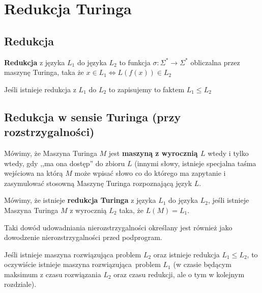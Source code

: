 \section{Redukcja Turinga}

\subsection{Redukcja}

\begin{definition}

	\textbf{Redukcja} z języka \( L_1 \) do języka \( L_2 \) to funkcja \( \sigma: \Sigma^* \rightarrow \Sigma^*\) obliczalna przez maszynę Turinga, taka że \( x \in L_1 \iff L(f(x)) \in L_2 \)

	Jeśli istnieje redukcja z \( L_1 \) do \( L_2 \) to zapisujemy to faktem \( L_1 \leq L_2 \)
\end{definition}

\subsection{Redukcja w sensie Turinga (przy rozstrzygalności)}

\begin{definition}
	Mówimy, że Maszyna Turinga \(M\) jest \textbf{maszyną z wyrocznią \(L\)} wtedy i tylko wtedy, gdy ,,ma ona dostęp'' do zbioru \(L\) (innymi słowy, istnieje specjalna taśma wejściowa na którą \(M\) może wpisać słowo co do którego ma zapytanie i zasymulować stosowną Maszynę Turinga rozpoznającą język \(L\).
\end{definition}

\begin{definition}
	Mówimy, że istnieje \textbf{redukcja Turinga} z języka \(L_1 \) do języka \( L_2\), jeśli istnieje Maszyna Turinga \(M\) z wyrocznią \(L_2\) taka, że \(L(M) = L_1\).

	Taki dowód udowadniania nierozstrzygalności określany jest również jako dowodzenie nierozstrzygalności przed podprogram.
\end{definition}

\begin{corollary}
	Jeśli istnieje maszyna rozwiązująca problem \(L_2\) oraz istnieje redukcja \(L_1 \leq L_2 \), to oczywiście istnieje maszyna rozwiązująca\
	problem \(L_1\) (w czasie będącym maksimum z czasu rozwiązania \(L_2\) oraz czasu redukcji, ale o tym w kolejnym rozdziale).
\end{corollary}